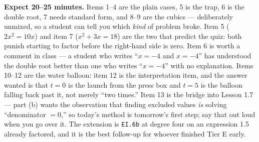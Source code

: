 \documentclass[10pt]{article}
\begin{document}
\begin{teachernote}[Homework]
    \textbf{Expect 20--25 minutes.} Items 1--4 are the plain cases, 5 is the trap, 6 is the double
    root, 7 needs standard form, and 8--9 are the cubics --- deliberately unmixed, so a student can
    tell you which \emph{kind} of problem broke. Item 5 ($2x^2=10x$) and item 7 ($x^2+3x=18$) are
    the two that predict the quiz: both punish starting to factor before the right-hand side is
    zero. Item 6 is worth a comment in class --- a student who writes ``$x=-4$ and $x=-4$'' has
    understood the double root better than one who writes ``$x=-4$'' with no explanation. Items
    10--12 are the water balloon: item 12 is the interpretation item, and the answer wanted is that
    $t=0$ is the launch from the press box and $t=5$ is the balloon falling back past it, not merely
    ``two times.'' Item 13 is the bridge into Lesson 1.7 --- part (b) wants the observation that
    finding excluded values \emph{is} solving ``denominator $=0$,'' so today's method is tomorrow's
    first step; say that out loud when you go over it. The extension is \texttt{EI.6b} at degree
    four on an expression 1.5 already factored, and it is the best follow-up for whoever finished
    Tier E early.
\end{teachernote}
\end{document}
